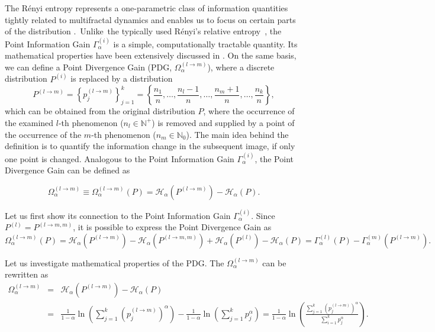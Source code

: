 \documentclass[entropy,article,accept,moreauthors,pdftex,10pt,a4paper]{mdpi}
\begin{document}
The R\'{e}nyi entropy represents a one-parametric class of information quantities tightly related to multifractal dynamics and enables us to focus on certain parts of the distribution \cite{Ji04a}.~Unlike~the typically used R\'{e}nyi's relative entropy~\cite{Re61,Ku57,Ji04a,Cs75,Ha06,Er07,Er10,Ji12,Ji14}, the Point Information Gain $\Gamma_{\alpha}^{(i)}$ is a simple, computationally tractable quantity. Its mathematical properties have been extensively discussed in \cite{Ryc16a}. On the same basis, we can define a Point Divergence Gain (PDG, $\Omega_\alpha^{(l \rightarrow m)}$), where a discrete distribution $P^{(i)}$ is replaced by a distribution
\begin{equation}\label{eq: rep}
P^{(l \rightarrow m)} = \left\{p_j^{(l \rightarrow m)}\right\}_{j=1}^k = \left\{\frac{n_1}{n},\dots,\frac{n_l-1}{n},\dots, \frac{n_m+1}{n},\dots,\frac{n_k}{n}\right\},
\end{equation}
%
which can be obtained from the original distribution $P$, where the occurrence of the examined $l$-th phenomenon ($n_l \in \mathbb{N}^+$) is removed and supplied by a point of the occurrence of the $m$-th phenomenon ($n_m \in \mathbb{N}_0$). The main idea behind the definition is to quantify the information change in the subsequent image, if only one point is changed. Analogous to the Point Information Gain $\Gamma_{\alpha}^{(i)}$, the Point Divergence Gain can be defined as

\begin{equation}
\Omega_\alpha^{(l \rightarrow m)} \equiv \Omega_\alpha^{(l \rightarrow m)}(P) = \mathscr{H}_\alpha\left(P^{(l \rightarrow m)}\right) - \mathscr{H}_\alpha(P).
\end{equation}

Let us first show its connection to the Point Information Gain $\Gamma_{\alpha}^{(i)}$. Since $P^{(l)} = P^{(l \rightarrow m,m)}$, it is possible to express the Point Divergence Gain as
\begin{equation}
\Omega_\alpha^{(l \rightarrow m)}(P)  = \mathscr{H}_\alpha\left(P^{(l \rightarrow m)}\right) - \mathscr{H}_\alpha\left(P^{(l \rightarrow m,m)}\right) + \mathscr{H}_\alpha\left(P^{(l)}\right)  - \mathscr{H}_\alpha(P) = \Gamma_\alpha^{(l)}(P) - \Gamma_\alpha^{(m)}(P^{(l \rightarrow m)}).
\end{equation}

Let us investigate mathematical properties of the PDG. The $\Omega_\alpha^{(l \rightarrow m)}$ can be rewritten as
\begin{eqnarray}
\label{eq:1}
\Omega_\alpha^{(l \rightarrow m)} &=& \mathscr{H}_\alpha\left(P^{(l \rightarrow m)}\right) - \mathscr{H}_\alpha(P)\nonumber\\
  &=& \frac{1}{1-\alpha}\ln \left(\sum_{j=1}^k \left(p_j^{(l \rightarrow m)}\right)^\alpha\right) - \frac{1}{1-\alpha} \ln \left(\sum_{j=1}^k {p_j^\alpha}\right) = \frac{1}{1-\alpha} \ln \left(\frac {\sum_{j=1}^k \left(p_j^{(l \rightarrow m)}\right)^\alpha}{\sum_{i=1}^k{p_j^\alpha}}\right).
\end{eqnarray}
\end{document}
